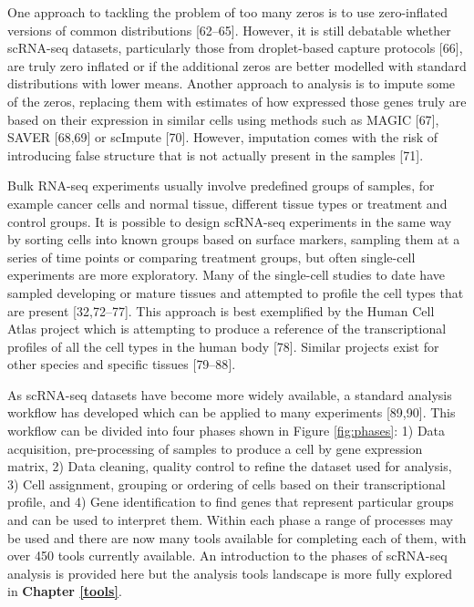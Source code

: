 \documentclass[11pt,a4paper,titlepage,twoside,openright]{style/unimelbthesis}
\theoremstyle{definition}
\theoremstyle{definition}
\theoremstyle{definition}
\theoremstyle{remark}
\begin{document}
\begin{mainmatter}
One approach to tackling the problem of too many zeros is to use zero-inflated versions of common distributions {[}62--65{]}. However, it is still debatable whether scRNA-seq datasets, particularly those from droplet-based capture protocols {[}66{]}, are truly zero inflated or if the additional zeros are better modelled with standard distributions with lower means. Another approach to analysis is to impute some of the zeros, replacing them with estimates of how expressed those genes truly are based on their expression in similar cells using methods such as MAGIC {[}67{]}, SAVER {[}68,69{]} or scImpute {[}70{]}. However, imputation comes with the risk of introducing false structure that is not actually present in the samples {[}71{]}.

Bulk RNA-seq experiments usually involve predefined groups of samples, for example cancer cells and normal tissue, different tissue types or treatment and control groups. It is possible to design scRNA-seq experiments in the same way by sorting cells into known groups based on surface markers, sampling them at a series of time points or comparing treatment groups, but often single-cell experiments are more exploratory. Many of the single-cell studies to date have sampled developing or mature tissues and attempted to profile the cell types that are present {[}32,72--77{]}. This approach is best exemplified by the Human Cell Atlas project which is attempting to produce a reference of the transcriptional profiles of all the cell types in the human body {[}78{]}. Similar projects exist for other species and specific tissues {[}79--88{]}.

As scRNA-seq datasets have become more widely available, a standard analysis workflow has developed which can be applied to many experiments {[}89,90{]}. This workflow can be divided into four phases shown in Figure \ref{fig:phases}: 1) Data acquisition, pre-processing of samples to produce a cell by gene expression matrix, 2) Data cleaning, quality control to refine the dataset used for analysis, 3) Cell assignment, grouping or ordering of cells based on their transcriptional profile, and 4) Gene identification to find genes that represent particular groups and can be used to interpret them. Within each phase a range of processes may be used and there are now many tools available for completing each of them, with over 450 tools currently available. An introduction to the phases of scRNA-seq analysis is provided here but the analysis tools landscape is more fully explored in \textbf{Chapter \ref{tools}}.


\end{mainmatter}
\end{document}
